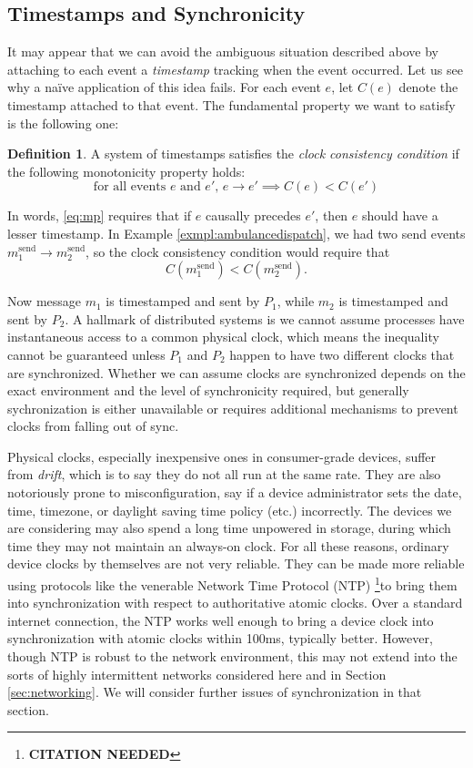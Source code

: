 \documentclass[]             %
{NASA}                       %
\theoremstyle{definition}
\newtheorem{definition}{Definition}[section]
\newcommand{\citationneeded}{\footnote{\textbf{CITATION NEEDED}}}
\begin{document}
\subsection{Timestamps and Synchronicity}
It may appear that we can avoid the ambiguous situation described
above by attaching to each event a \emph{timestamp} tracking when the
event occurred. Let us see why a na\"ive application of this idea
fails. For each event $e$, let $C(e)$ denote the timestamp attached to
that event. The fundamental property we want to satisfy is the
following one:
\begin{definition}
  A system of timestamps satisfies the \emph{clock consistency
  condition} if the following monotonicity property holds:
  \[ \textrm{for all events $e$ and $e'$, } e \to e' \implies C(e) < C(e') \label{eq:mp}\tag{CC} \]
\end{definition}
In words, \ref{eq:mp} requires that if $e$ causally precedes $e'$,
then $e$ should have a lesser timestamp. In Example
\ref{exmpl:ambulancedispatch}, we had two send events
$m_1^\textrm{send} \to m_2^\textrm{send}$, so the clock consistency
condition would require that
\[C(m_1^\textrm{send}) < C(m_2^\textrm{send}).\]

Now message $m_1$ is timestamped and sent by $P_1$, while $m_2$ is
timestamped and sent by $P_2$. A hallmark of distributed systems is we
cannot assume processes have instantaneous access to a common physical
clock, which means the inequality cannot be guaranteed unless $P_1$
and $P_2$ happen to have two different clocks that are
synchronized. Whether we can assume clocks are synchronized depends on
the exact environment and the level of synchronicity required, but
generally sychronization is either unavailable or requires additional
mechanisms to prevent clocks from falling out of sync.

Physical clocks, especially inexpensive ones in consumer-grade
devices, suffer from \emph{drift}, which is to say they do not all run
at the same rate. They are also notoriously prone to misconfiguration,
say if a device administrator sets the date, time, timezone, or
daylight saving time policy (etc.) incorrectly. The devices we are
considering may also spend a long time unpowered in storage, during
which time they may not maintain an always-on clock.  For all these
reasons, ordinary device clocks by themselves are not very
reliable. They can be made more reliable using protocols like the
venerable Network Time Protocol (NTP) \citationneeded to bring them
into synchronization with respect to authoritative atomic clocks. Over
a standard internet connection, the NTP works well enough to bring a
device clock into synchronization with atomic clocks within 100ms,
typically better. However, though NTP is robust to the network
environment, this may not extend into the sorts of highly intermittent
networks considered here and in Section \ref{sec:networking}. We will
consider further issues of synchronization in that section.
\end{document}
